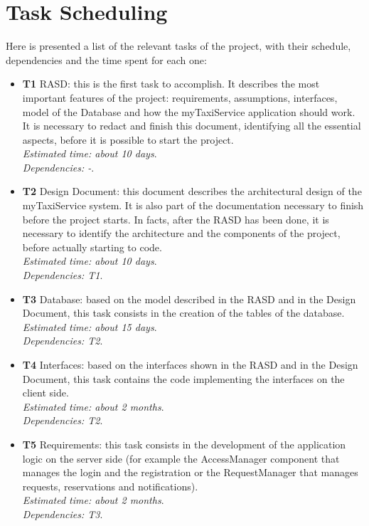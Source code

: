 \documentclass[18pt,oneside,a4paper, titlepage]{article}
\begin{document}
\section{Task Scheduling}
	Here is presented a list of the relevant tasks of the project, with their schedule, dependencies and the time spent for each one:
	\begin{itemize}
		\item \textbf{T1} RASD: this is the first task to accomplish. It describes the most important features of the project: requirements, assumptions, interfaces, model of the Database and how the myTaxiService application should work. It is necessary to redact and finish this document, identifying all the essential aspects, before it is possible to start the project.\\ \textit{Estimated time: about 10 days}.\\ \textit{Dependencies: -}.
		\item \textbf{T2} Design Document: this document describes the architectural design of the myTaxiService system. It is also part of the documentation necessary to finish before the project starts. In facts, after the RASD has been done, it is necessary to identify the architecture and the components of the project, before actually starting to code.\\ \textit{Estimated time: about 10 days}.\\ \textit{Dependencies: T1}.
		\item \textbf{T3} Database: based on the model described in the RASD and in the Design Document, this task consists in the creation of the tables of the database.\\ \textit{Estimated time: about 15 days}.\\ \textit{Dependencies: T2}.
		\item \textbf{T4} Interfaces: based on the interfaces shown in the RASD and in the Design Document, this task contains the code implementing the interfaces on the client side.\\ \textit{Estimated time: about 2 months}.\\ \textit{Dependencies: T2}.
		\item \textbf{T5} Requirements: this task consists in the development of the application logic on the server side (for example the AccessManager component that manages the login and the registration or the RequestManager that manages requests,  reservations and notifications).\\ \textit{Estimated time: about 2 months}.\\ \textit{Dependencies: T3}.

\end{itemize}
\end{document}
